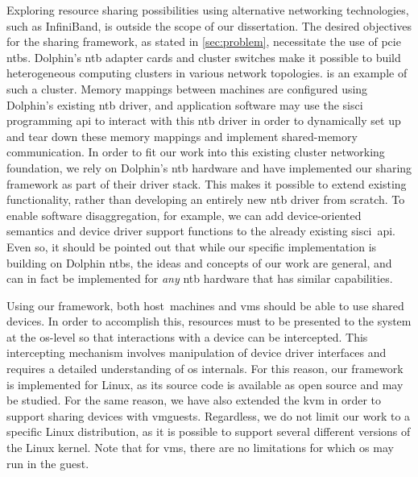 Exploring resource sharing possibilities using alternative networking technologies, such as InfiniBand, is outside the scope of our dissertation.
%
The desired objectives for the sharing framework, as stated in \cref{sec:problem}, necessitate the use of \gls{pcie} \glspl{ntb}. %
%
Dolphin's \gls{ntb} adapter cards and cluster switches make it possible to build heterogeneous computing clusters in various network topologies.
%
 is an example of such a cluster.
%
Memory mappings between machines are configured using Dolphin's existing \gls{ntb} driver, and application software may use the \gls{sisci} programming \gls{api} to interact with this \gls{ntb} driver in order to dynamically set up and tear down these memory mappings and implement shared-memory communication.
%
In order to fit our work into this existing cluster networking foundation, we rely on Dolphin's \gls{ntb} hardware and have implemented our sharing framework as part of their driver stack.
%
This makes it possible to extend existing functionality, rather than developing an entirely new \gls{ntb} driver from scratch.
%
To enable software \gls{disaggregation}, for example, we can add device-oriented semantics and device driver support functions to the already existing \gls{sisci}~\gls{api}. 
%
Even so, it should be pointed out that while our specific implementation is building on Dolphin \glspl{ntb}, the ideas and concepts of our work are general, and can in fact be implemented for \emph{any} \gls{ntb} hardware that has similar capabilities.



Using our framework, both \gls{host}~machines and \glspl{vm} should be able to use shared devices.
%
In order to accomplish this, resources must to be presented to the system at the \gls{os}-level so that interactions with a device can be intercepted. 
%
This intercepting mechanism involves manipulation of device driver interfaces and requires a detailed understanding of \gls{os} internals.
%
For this reason, our framework is implemented for Linux, as its source code is available as open source and may be studied.
%
For the same reason, we have also extended the \gls{kvm} in order to support sharing devices with \glspl{vmguest}.
%
Regardless, we do not limit our work to a specific Linux distribution, as it is possible to support several different versions of the Linux kernel.
%
Note that for \glspl{vm}, there are no limitations for which \gls{os} may run in the \gls{guest}.



